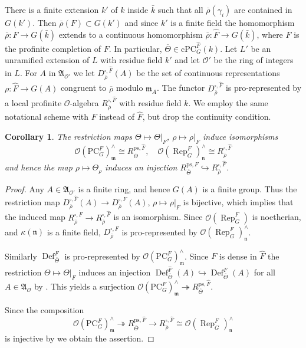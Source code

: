 \documentclass{amsart}
\newtheorem{cor}[prop]{Corollary}
\theoremstyle{definition}
\theoremstyle{remark}
\DeclareMathOperator{\Rep}{Rep}
\DeclareMathOperator{\Def}{Def}
\newcommand{\Aa}{\mathfrak A}
\newcommand{\mm}{\mathfrak m}
\newcommand{\OO}{\mathcal O}
\newcommand{\nn}{\mathfrak n}
\newcommand{\rhobar}{\overline{\rho}}
\newcommand{\kbar}{\bar{k}}
\newcommand{\PC}{\mathrm{PC}}
\newcommand{\cPC}{\mathrm{cPC}}
\newcommand{\Thetabar}{\overline{\Theta}}
\newcommand{\ps}{\mathrm{ps}}
\newcommand{\Fhat}{\widehat{F}}
\begin{document}
There is a finite extension $k'$ of $k$ inside $\kbar$ such that all
$\rhobar(\gamma_i)$ are contained in $G(k')$. Then 
$\rhobar(F)\subset G(k')$ and since $k'$ is a finite field the homomorphism 
$\rhobar: F\rightarrow G(\kbar)$ extends to a continuous homomorphism $\rhobar: \Fhat\rightarrow G(\kbar)$, 
where $\Fhat$ is the profinite completion of $F$.
In particular, $\Thetabar\in \cPC^{\Fhat}_G(k)$.
Let $L'$ be an unramified extension of $L$ with 
residue field $k'$ and let $\OO'$ be the ring of integers in $L$. 
For $A$ in $\Aa_{\OO'}$ we let  
$D^{\square, \widehat{F}}_{\rhobar}(A)$
be the set of continuous representations $\rho:\widehat{F}\rightarrow G(A)$ congruent to $\rhobar$ modulo $\mm_A$. The functor $D^{\square, \widehat{F}}_{\rhobar}$ is pro-represented by a local profinite $\OO$-algebra $R^{\square, \Fhat}_{\rhobar}$ with residue field $k$. We employ the same notational scheme with $F$ instead of $\Fhat$, but drop the continuity condition. 

\begin{cor}\label{inject_free} The restriction maps $\Theta \mapsto \Theta|_F$, $\rho\mapsto \rho|_F$  induce  isomorphisms 
\begin{equation}
\OO(\PC^F_G)_{\mm}^{\wedge}\cong R^{\ps, \Fhat}_{\Thetabar}, \quad \OO(\Rep^F_G)_{\nn}^{\wedge}\cong R^{\square, \Fhat}_{\rhobar}
\end{equation}
and hence the map $\rho\mapsto \Theta_{\rho}$ induces an injection 
$R^{\ps, \Fhat}_{\Thetabar} \hookrightarrow R^{\square, \Fhat}_{\rhobar}$. 
\end{cor}
\begin{proof} Any $A\in \Aa_{\OO'}$ is a finite ring, and hence $G(A)$ is a finite group. 
Thus the restriction map $D^{\square, \Fhat}_{\rhobar}(A)\rightarrow D^{\square, F}_{\rhobar}(A)$, $\rho \mapsto \rho|_{F}$ is bijective, which implies that the induced map $R^{\square, F}_{\rhobar}\rightarrow R^{\square, \Fhat}_{\rhobar}$ is an isomorphism. Since $\OO(\Rep^F_G)$ is noetherian, and $\kappa(\nn)$ is
a finite field, $D^{\square, F}_{\rhobar}$ is pro-represented by $\OO(\Rep^F_G)_{\nn}^{\wedge}$.

Similarly $\Def^F_{\Thetabar}$ is pro-represented 
by $\OO(\PC^F_G)_{\mm}^{\wedge}$. Since $F$ is dense in $\Fhat$ the restriction $\Theta\mapsto \Theta|_F$ induces an injection $\Def^{\Fhat}_{\Thetabar}(A)\hookrightarrow \Def^F_{\Thetabar}(A)$  for all $A\in \Aa_{\OO}$
by \cite[Lemma 3.2]{quast}. This yields a 
surjection 
$\OO(\PC^F_G)_{\mm}^{\wedge}\twoheadrightarrow R^{\ps, \Fhat}_{\Thetabar}$. 

Since the composition 
\begin{equation}
\OO(\PC^F_G)_{\mm}^{\wedge}\twoheadrightarrow R^{\ps, \Fhat}_{\Thetabar}\rightarrow R^{\square, \Fhat}_{\rhobar}\cong \OO(\Rep^F_G)_{\nn}^{\wedge}
\end{equation}
is injective by  we obtain the assertion.
\end{proof} 
\end{document}
